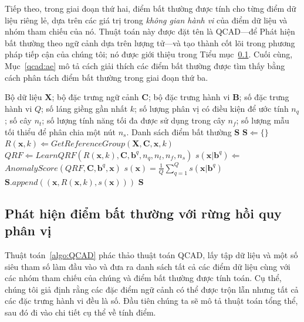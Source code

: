 Tiếp theo, trong giai đoạn thứ hai, điểm bất thường được tính cho từng điểm dữ liệu riêng lẻ, dựa trên các giá trị trong \emph{không gian hành vi} của điểm dữ liệu và nhóm tham chiếu của nó. Thuật toán này được đặt tên là QCAD---để Phát hiện bất thường theo ngữ cảnh dựa trên lượng tử---và tạo thành cốt lõi trong phương pháp tiếp cận của chúng tôi; nó được giới thiệu trong Tiểu mục~\ref{qcad:ad}.
Cuối cùng, Mục~\ref{qcad:ae} mô tả cách giải thích các điểm bất thường được tìm thấy bằng cách phân tách điểm bất thường trong giai đoạn thứ ba.\begin{algorithm}
\caption{Phát hiện bất thường theo ngữ cảnh dựa trên phân vị (QCAD)}\label{algo:QCAD}
\begin{algorithmic}[1]
\Require Bộ dữ liệu $\mathbf{X}$; bộ đặc trưng ngữ cảnh $\mathbf{C}$; bộ đặc trưng hành vi $\mathbf{B}$; số đặc trưng hành vi $Q$; số láng giềng gần nhất $k$; số lượng phân vị có điều kiện để ước tính $n_q$; số cây $n_t$; số lượng tính năng tối đa được sử dụng trong cây $n_f$; số lượng mẫu tối thiểu để phân chia một nút $n_s$.
\Ensure Danh sách điểm bất thường $\mathbf{S}$
\State $\mathbf{S} \Leftarrow \{\}$
    \State $R(\mathbf{x},k) \Leftarrow GetReferenceGroup (\mathbf{X},\mathbf{C},\mathbf{x},k)$
    \State $QRF \Leftarrow LearnQRF(R(\mathbf{x},k),\mathbf{C},\mathbf{b}^{q}, n_q, n_t, n_f, n_s)$
    \State $s(\mathbf{x}\rvert\mathbf{b}^{q}) \Leftarrow$ $AnomalyScore(QRF, \mathbf{C},\mathbf{b}^{q}, \mathbf{x})$
    \EndFor
    \State $s(\mathbf{x}) = \frac{1}{Q}\sum_{q = 1}^{Q}s(\mathbf{x}\rvert\mathbf{b}^{q})$
     \State $\mathbf{S}.append((\mathbf{x},R(\mathbf{x},k),s(\mathbf{x})))$
\EndFor
\State \Return $\mathbf{S}$
\EndProcedure
\end{algorithmic}
\end{algorithm}

\subsection{Phát hiện điểm bất thường với rừng hồi quy phân vị}
\label{qcad:ad}

Thuật toán~\ref{algo:QCAD} phác thảo thuật toán QCAD, lấy tập dữ liệu và một số siêu tham số làm đầu vào và đưa ra danh sách tất cả các điểm dữ liệu cùng với các nhóm tham chiếu của chúng và điểm bất thường được tính toán.  Cụ thể, chúng tôi giả định rằng các đặc điểm ngữ cảnh có thể được trộn lẫn nhưng tất cả các đặc trưng hành vi đều là số. Đầu tiên chúng ta sẽ mô tả thuật toán tổng thể, sau đó đi vào chi tiết cụ thể về tính điểm.


